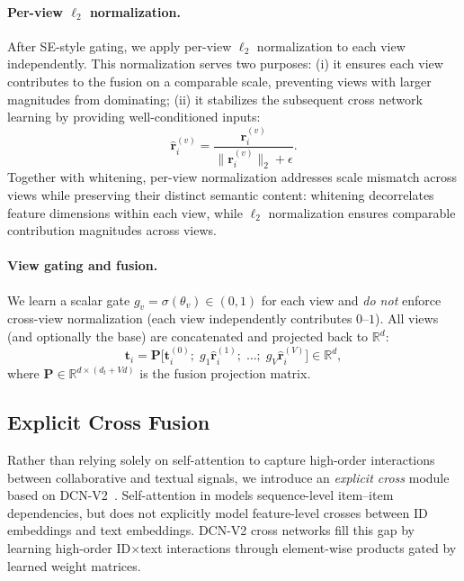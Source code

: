 \paragraph{Per-view $\ell_2$ normalization.}
After SE-style gating, we apply per-view $\ell_2$ normalization
to each view independently. This normalization serves two purposes:
(i) it ensures each view contributes to the fusion on a comparable
scale, preventing views with larger magnitudes from dominating;
(ii) it stabilizes the subsequent cross network learning by
providing well-conditioned inputs:
\begin{equation}
  \hat{\mathbf{r}}_i^{(v)} = \frac{\mathbf{r}_i^{(v)}}{\lVert \mathbf{r}_i^{(v)} \rVert_2 + \epsilon}.
\end{equation}
Together with whitening, per-view normalization addresses scale mismatch
across views while preserving their distinct semantic content: whitening
decorrelates feature dimensions within each view, while $\ell_2$
normalization ensures comparable contribution magnitudes across views.

\paragraph{View gating and fusion.}
We learn a scalar gate $g_v=\sigma(\theta_v)\in(0,1)$ for each
view and \emph{do not} enforce cross-view normalization (each
view independently contributes $0$--$1$). All views (and
optionally the \tfidf base) are concatenated and projected
back to $\mathbb{R}^d$:
\begin{equation}
  \mathbf{t}_i = \mathbf{P}\Big[\mathbf{t}_i^{(0)};\; g_1\hat{\mathbf{r}}_i^{(1)};\; \dots;\; g_V\hat{\mathbf{r}}_i^{(V)}\Big] \in \mathbb{R}^d,
\end{equation}
where $\mathbf{P} \in \mathbb{R}^{d \times (d_t + Vd)}$ is the fusion projection matrix.

\subsection{Explicit Cross Fusion}
Rather than relying solely on self-attention to capture
high-order interactions between collaborative and textual
signals, we introduce an \emph{explicit cross} module based on
DCN-V2~\cite{wang2021dcnv2}. Self-attention in \base models
sequence-level item--item dependencies, but does not
explicitly model feature-level crosses between ID embeddings
and text embeddings. DCN-V2 cross networks fill this gap by
learning high-order ID$\times$text interactions through
element-wise products gated by learned weight matrices.

